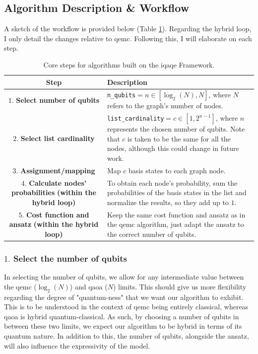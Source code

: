 \subsection{Algorithm Description \& Workflow}
\label{subsection:iQAQE Description_Workflow}
A sketch of the workflow is provided below (Table \ref{tab:iQAQE_Steps}). Regarding the hybrid loop, I only detail the changes relative to \acrshort{qemc}. Following this, I will elaborate on each step.
\begin{table}[h!]
    \centering
    \begin{tabular}{|c|p{9.5cm}|}
    \hline
    \textbf{Step} & \textbf{Description} \\ \hline
    $1.$ \textbf{Select number of qubits} & \texttt{n\_qubits}$ = n \in \left[\log_2{(N)}, N\right]$, where $N$ refers to the graph's number of nodes. \\ \hline
    $2.$ \textbf{Select list cardinality} & \texttt{list\_cardinality}$ = c \in \left[1, 2^{n - 1}\right]$, where $n$ represents the chosen number of qubits. Note that $c$ is taken to be the same for all the nodes, although this could change in future work. \\ \hline
    $3.$ \textbf{Assignment/mapping} & Map $c$ basis states to each graph node. \\ \hline
    \makecell{$4.$ \textbf{Calculate nodes' probabilities} \\ \textbf{(within the hybrid loop)}} & To obtain each node's probability, sum the probabilities of the basis states in the list and normalize the results, so they add up to $1$. \\ \hline
    \makecell{$5.$ \textbf{Cost function and ansatz} \\ \textbf{(within the hybrid loop)}} & Keep the same cost function and ansatz as in the \acrshort{qemc} algorithm, just adapt the ansatz to the correct number of qubits. \\ \hline
    \end{tabular}
    \caption{Core steps for algorithms built on the \acrshort{iqaqe} Framework.}
    \label{tab:iQAQE_Steps}
\end{table}

\subsubsection*{$1.$ Select the number of qubits}
In selecting the number of qubits, we allow for any intermediate value between the \acrshort{qemc} ($\log_2{(N)}$) and \acrshort{qaoa} ($N$) limits. This should give us more flexibility regarding the degree of "quantum-ness" that we want our algorithm to exhibit. This is to be understood in the context of \acrshort{qemc} being entirely classical, whereas \acrshort{qaoa} is hybrid quantum-classical. As such, by choosing a number of qubits in between these two limits, we expect our algorithm to be hybrid in terms of its quantum nature. In addition to this, the number of qubits, alongside the ansatz, will also influence the expressivity of the model.

